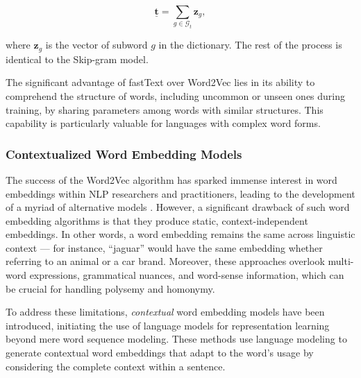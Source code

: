 \begin{equation}
    \bm{\underline{t}} = \sum_{g \in \mathcal{G}_t} \bm{z}_g,
\end{equation}

where $\bm{z}_g$ is the vector of subword $g$ in the dictionary. The rest of the process is identical to the Skip-gram model.

The significant advantage of fastText over Word2Vec lies in its ability to comprehend the structure of words, including uncommon or unseen ones during training, by sharing parameters among words with similar structures. This capability is particularly valuable for languages with complex word forms.

\subsubsection{Contextualized Word Embedding Models}


The success of the Word2Vec algorithm \citep{mikolov2013efficient} has sparked immense interest in word embeddings within \ac{NLP} researchers and practitioners, leading to the development of a myriad of alternative models \citep{pennington2014glove, shazeer2016swivel, bojanowski2017enriching}. However, a significant drawback of such word embedding algorithms is that they produce static, context-independent embeddings. In other words, a word embedding remains the same across linguistic context — for instance, “jaguar” would have the same embedding whether referring to an animal or a car brand. Moreover, these approaches overlook multi-word expressions, grammatical nuances, and word-sense information, which can be crucial for handling polysemy and homonymy.

To address these limitations, \textit{contextual} word embedding models have been introduced, initiating the use of language models for representation learning beyond mere word sequence modeling. These methods use language modeling to generate contextual word embeddings that adapt to the word's usage by considering the complete context within a sentence. 

